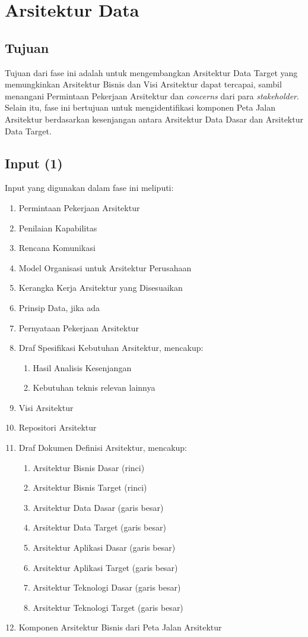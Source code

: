 \chapter{Arsitektur Data}

\section{Tujuan}
Tujuan dari fase ini adalah untuk mengembangkan Arsitektur Data Target yang memungkinkan Arsitektur Bisnis dan Visi Arsitektur dapat tercapai, sambil menangani Permintaan Pekerjaan Arsitektur dan \textit{concerns} dari para \textit{stakeholder}. Selain itu, fase ini bertujuan untuk mengidentifikasi komponen Peta Jalan Arsitektur berdasarkan kesenjangan antara Arsitektur Data Dasar dan Arsitektur Data Target.

\section{Input (1)}
Input yang digunakan dalam fase ini meliputi:
\begin{enumerate}
	\item Permintaan Pekerjaan Arsitektur
	\item Penilaian Kapabilitas
	\item Rencana Komunikasi
	\item Model Organisasi untuk Arsitektur Perusahaan
	\item Kerangka Kerja Arsitektur yang Disesuaikan
	\item Prinsip Data, jika ada
	\item Pernyataan Pekerjaan Arsitektur
	\item Draf Spesifikasi Kebutuhan Arsitektur, mencakup:
	\begin{enumerate}
		\item Hasil Analisis Kesenjangan
		\item Kebutuhan teknis relevan lainnya
	\end{enumerate}
	\item Visi Arsitektur
	\item Repositori Arsitektur
	\item Draf Dokumen Definisi Arsitektur, mencakup:
	\begin{enumerate}
		\item Arsitektur Bisnis Dasar (rinci)
		\item Arsitektur Bisnis Target (rinci)
		\item Arsitektur Data Dasar (garis besar)
		\item Arsitektur Data Target (garis besar)
		\item Arsitektur Aplikasi Dasar (garis besar)
		\item Arsitektur Aplikasi Target (garis besar)
		\item Arsitektur Teknologi Dasar (garis besar)
		\item Arsitektur Teknologi Target (garis besar)
	\end{enumerate}
	\item Komponen Arsitektur Bisnis dari Peta Jalan Arsitektur
\end{enumerate}

